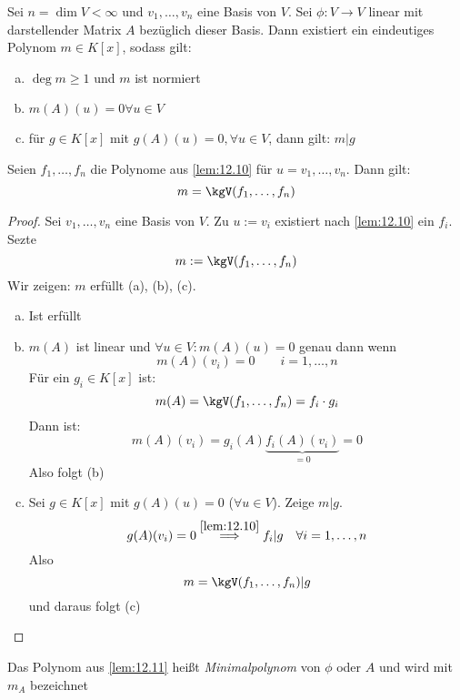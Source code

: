 \documentclass{mycourse}
\begin{document}
\begin{lem}[Minimalpolynom]
	\label{lem:12.11}
	Sei $n=\dim V <\infty$ und $v_1,\dotsc,v_n$ eine Basis von $V$.
	Sei $\phi:V\to V$ linear mit darstellender Matrix $A$ bezüglich dieser Basis.
	Dann existiert ein eindeutiges Polynom $m\in K[x]$, sodass gilt:
	\begin{enumerate}[(a)]
		\item
			$\deg m\ge 1$ und $m$ ist normiert
		\item
			$\displaystyle {m(A)(u)=0} \forall u\in V$
		\item
			für $g\in K[x]$ mit $g(A)(u)=0, \forall u\in V$, dann gilt: $m|g$
	\end{enumerate}
	
	Seien $f_1,\dotsc, f_n$ die Polynome aus \ref{lem:12.10} für $u=v_1,\dotsc, v_n$.
	Dann gilt:
	\[
		m=\kgV(f_1,\dotsc, f_n)
	\]
	\begin{proof}
		Sei $v_1,\dotsc,v_n$ eine Basis von $V$.
		Zu $u:=v_i$ existiert nach \ref{lem:12.10} ein $f_i$.
		Sezte
		\[
			m:= \kgV(f_1,\dotsc,f_n)
		\]
		Wir zeigen: $m$ erfüllt (a), (b), (c).
		\begin{enumerate}[(a)]
			\item
				Ist erfüllt
			\item
				$m(A)$ ist linear und $\forall u\in V: m(A)(u)=0$ genau dann wenn
				\[
					m(A)(v_i) = 0 \qquad i=1,\dotsc,n
				\]
				Für ein $g_i\in K[x]$ ist:
				\[
					m(A) = \kgV(f_1,\dotsc,f_n) = f_i \cdot g_i
				\]
				Dann ist:
				\[
					m(A)(v_i) = g_i(A)\underbrace{f_i(A)(v_i)}_{=0} = 0
				\]
				Also folgt (b)
			\item
				Sei $g\in K[x]$ mit $g(A)(u)=0$ ($\forall u\in V$).
				Zeige $m|g$.
				\[
					g(A)(v_i) = 0  \stackrel{\ref{lem:12.10}}\implies f_i|g \quad\forall i=1,\dotsc,n
				\]
				Also
				\[
					m=\kgV(f_1,\dotsc,f_n) |g
				\]
				und daraus folgt (c)
		\end{enumerate}
	\end{proof}
\end{lem}

\begin{df}
	\label{df:12.12}
	Das Polynom aus \ref{lem:12.11} heißt \emph{Minimalpolynom} von $\phi$ oder $A$ und wird mit
	$
		m_A
	$
	bezeichnet
\end{df}
\end{document}
